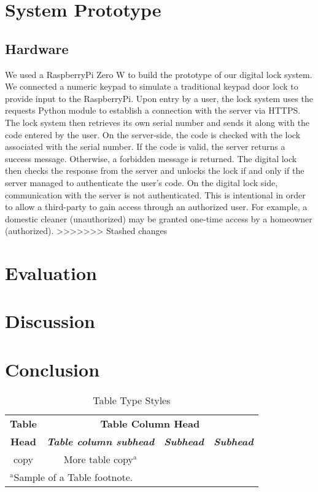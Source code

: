 \documentclass[conference]{IEEEtran}
\begin{document}
\section{System Prototype}
\subsection{Hardware}
	We used a RaspberryPi Zero W to build the prototype of our digital lock system. We connected a numeric keypad to simulate a traditional keypad door lock to provide input to the RaspberryPi. Upon entry by a user, the lock system uses the requests Python module to establish a connection with the server via HTTPS. The lock system then retrieves its own serial number and sends it along with the code entered by the user. On the server-side, the code is checked with the lock associated with the serial number. If the code is valid, the server returns a success message. Otherwise, a forbidden message is returned. The digital lock then checks the response from the server and unlocks the lock if and only if the server managed to authenticate the user’s code. On the digital lock side, communication with the server is not authenticated. This is intentional in order to allow a third-party to gain access through an authorized user. For example, a domestic cleaner (unauthorized) may be granted one-time access by a homeowner (authorized).
>>>>>>> Stashed changes

\section{Evaluation}

\section{Discussion}

\section{Conclusion}

\begin{table}[htbp]
\caption{Table Type Styles}
\begin{center}
\begin{tabular}{|c|c|c|c|}
\hline
\textbf{Table}&\multicolumn{3}{|c|}{\textbf{Table Column Head}} \\
\cline{2-4} 
\textbf{Head} & \textbf{\textit{Table column subhead}}& \textbf{\textit{Subhead}}& \textbf{\textit{Subhead}} \\
\hline
copy& More table copy$^{\mathrm{a}}$& &  \\
\hline
\multicolumn{4}{l}{$^{\mathrm{a}}$Sample of a Table footnote.}
\end{tabular}
\label{tab1}
\end{center}
\end{table}
\end{document}
